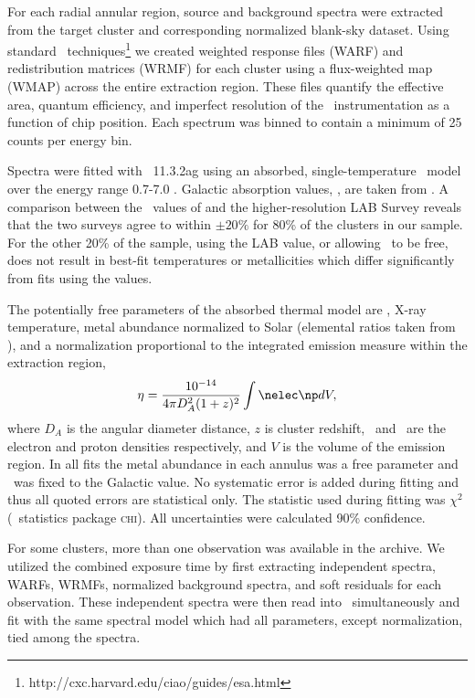 \documentclass{emulateapj}
\begin{document}
For each radial annular region, source and background spectra were
extracted from the target cluster and corresponding normalized
blank-sky dataset. Using standard
\ciao\ techniques\footnote{http://cxc.harvard.edu/ciao/guides/esa.html}
we created weighted response files (WARF) and redistribution matrices
(WRMF) for each cluster using a flux-weighted map (WMAP) across the
entire extraction region. These files quantify the effective area,
quantum efficiency, and imperfect resolution of the
\chandra\ instrumentation as a function of chip position. Each
spectrum was binned to contain a minimum of 25 counts per energy bin.

Spectra were fitted with \xspec\ 11.3.2ag \citep{xspec} using an
absorbed, single-temperature \mekal\ model \citep{mekal1, mekal2} over
the energy range 0.7-7.0 \keV. Galactic absorption values, \nhi, are
taken from \cite{dickeylockman}. A comparison between the \nhi\ values
of \cite{dickeylockman} and the higher-resolution LAB Survey
\citep{lab} reveals that the two surveys agree to within $\pm 20\%$
for 80\% of the clusters in our sample. For the other 20\% of the
sample, using the LAB value, or allowing \nhi\ to be free, does not
result in best-fit temperatures or metallicities which differ
significantly from fits using the \cite{dickeylockman} values.

The potentially free parameters of the absorbed thermal model are
\nhi, X-ray temperature, metal abundance normalized to Solar
(elemental ratios taken from \citealt{ag89}), and a normalization
proportional to the integrated emission measure within the extraction
region,
\begin{equation}
\label{eqn:norm}
\eta = \frac{10^{-14}}{4\pi D_A^2(1+z)^2}\int \nelec \np dV,
\end{equation}
where $D_A$ is the angular diameter distance, $z$ is cluster redshift,
\nelec\ and \np\ are the electron and proton densities respectively,
and $V$ is the volume of the emission region. In all fits the metal
abundance in each annulus was a free parameter and \nhi\ was fixed to
the Galactic value. No systematic error is added during fitting and
thus all quoted errors are statistical only. The statistic used during
fitting was $\chi^2$ (\xspec\ statistics package \textsc{chi}). All
uncertainties were calculated 90\% confidence.

For some clusters, more than one observation was available in the
archive. We utilized the combined exposure time by first extracting
independent spectra, WARFs, WRMFs, normalized background spectra, and
soft residuals for each observation. These independent spectra were
then read into \xspec\ simultaneously and fit with the same spectral
model which had all parameters, except normalization, tied among the
spectra.
\end{document}

